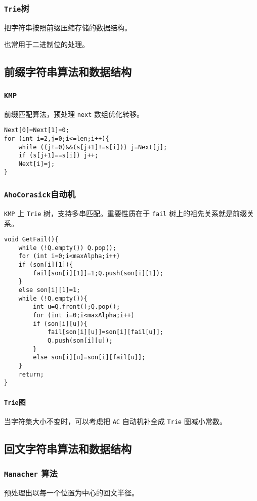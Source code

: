 \documentclass[UTF-8]{ctexart}
\begin{document}
	\subsubsection{\texttt{Trie}树}
	把字符串按照前缀压缩存储的数据结构。
	
	也常用于二进制位的处理。
	\subsection{前缀字符串算法和数据结构}
	\subsubsection{\texttt{KMP}}
	前缀匹配算法，预处理 \texttt{next} 数组优化转移。
\begin{verbatim}
Next[0]=Next[1]=0;
for (int i=2,j=0;i<=len;i++){
    while ((j!=0)&&(s[j+1]!=s[i])) j=Next[j];
    if (s[j+1]==s[i]) j++;
    Next[i]=j;
}
\end{verbatim}

	\subsubsection{\texttt{AhoCorasick}自动机}
	\texttt{KMP} 上 \texttt{Trie} 树，支持多串匹配。重要性质在于 \texttt{fail} 树上的祖先关系就是前缀关系。
	
\begin{verbatim}
void GetFail(){
    while (!Q.empty()) Q.pop();
    for (int i=0;i<maxAlpha;i++)
    if (son[i][1]){
        fail[son[i][1]]=1;Q.push(son[i][1]);
    }
    else son[i][1]=1;
    while (!Q.empty()){
        int u=Q.front();Q.pop();
        for (int i=0;i<maxAlpha;i++)
        if (son[i][u]){
            fail[son[i][u]]=son[i][fail[u]];
            Q.push(son[i][u]);
        }
        else son[i][u]=son[i][fail[u]];
    }
    return;
}
\end{verbatim}
	\paragraph{\texttt{Trie}图} 当字符集大小不变时，可以考虑把 \texttt{AC} 自动机补全成 \texttt{Trie} 图减小常数。
	\subsection{回文字符串算法和数据结构}
	\subsubsection{\texttt{Manacher} 算法}
	预处理出以每一个位置为中心的回文半径。
	
\end{document}
